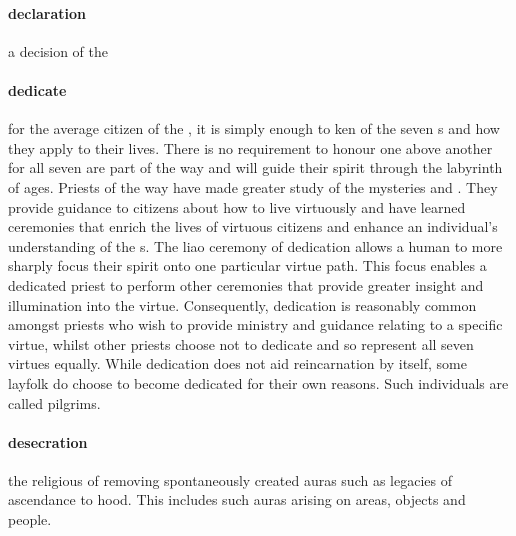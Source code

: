 \paragraph{declaration} a decision of the  %
\paragraph{dedicate} for the average citizen of the , it is simply enough to ken of the seven s and how they apply to their lives. There is no requirement to honour one above another for all seven are part of the way and will guide their spirit through the labyrinth of ages. Priests of the way have made greater study of the mysteries and . They provide guidance to citizens about how to live virtuously and have learned ceremonies that enrich the lives of virtuous citizens and enhance an individual’s understanding of the s. The liao ceremony of dedication allows a human to more sharply focus their spirit onto one particular virtue path. This focus enables a dedicated priest to perform other ceremonies that provide greater insight and illumination into the virtue. Consequently, dedication is reasonably common amongst priests who wish to provide ministry and guidance relating to a specific virtue, whilst other priests choose not to dedicate and so represent all seven virtues equally. While dedication does not aid reincarnation by itself, some layfolk do choose to become dedicated for their own reasons. Such individuals are called pilgrims. 
\paragraph{desecration} the religious  of removing spontaneously created auras such as legacies of ascendance to hood. This includes such auras arising on areas, objects and people.
